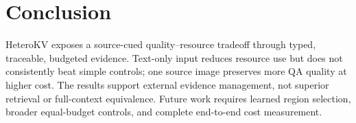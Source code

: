 ﻿\documentclass[conference]{IEEEtran}
\newcommand{\system}{HeteroKV\xspace}
\begin{document}
\section{Conclusion}
\system exposes a source-cued quality--resource tradeoff through typed, traceable, budgeted evidence. Text-only input reduces resource use but does not consistently beat simple controls; one source image preserves more QA quality at higher cost. The results support external evidence management, not superior retrieval or full-context equivalence. Future work requires learned region selection, broader equal-budget controls, and complete end-to-end cost measurement.



\end{document}
